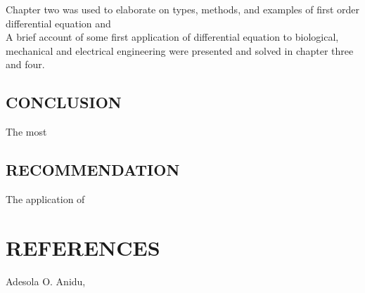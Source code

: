 \documentclass[11pt]{report}
\newcommand{\NI}{\noindent}
\begin{document}
	\NI Chapter two was used to elaborate on types, methods, and examples of first order differential equation and\\
	
	\NI A brief account of some first application of differential equation to biological, mechanical and electrical engineering were presented and solved in chapter three and four.
	
	
	\section{CONCLUSION}
	The most 
	
	
	\section{RECOMMENDATION}
	The application of  
	
	
	\chapter*{REFERENCES}
	
	\begin{description}
		\item Adesola O. Anidu,
	\end{description}
	
\end{document}
